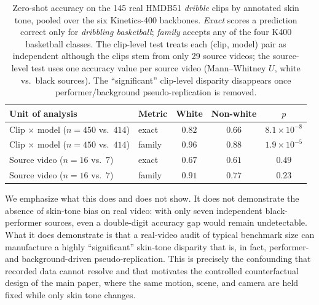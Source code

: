 \begin{table}[t]
\centering
\caption{Zero-shot accuracy on the 145 real HMDB51 \textit{dribble} clips by
annotated skin tone, pooled over the six Kinetics-400 backbones. \emph{Exact}
scores a prediction correct only for \textit{dribbling basketball};
\emph{family} accepts any of the four K400 basketball classes. The clip-level
test treats each (clip, model) pair as independent although the clips stem
from only 29 source videos; the source-level test uses one accuracy value per
source video (Mann--Whitney $U$, white vs.\ black sources). The
``significant'' clip-level disparity disappears once performer/background
pseudo-replication is removed.}
\label{tab:pahmdb51_dribble}
\begin{tabular}{llccc}
\toprule
Unit of analysis & Metric & White & Non-white & $p$ \\
\midrule
Clip $\times$ model ($n{=}450$ vs.\ $414$) & exact  & $0.82$ & $0.66$ & $8.1\times10^{-8}$ \\
Clip $\times$ model ($n{=}450$ vs.\ $414$) & family & $0.96$ & $0.88$ & $1.9\times10^{-5}$ \\
Source video ($n{=}16$ vs.\ $7$)           & exact  & $0.67$ & $0.61$ & $0.49$ \\
Source video ($n{=}16$ vs.\ $7$)           & family & $0.91$ & $0.77$ & $0.23$ \\
\bottomrule
\end{tabular}
\end{table}

We emphasize what this does and does not show. It does not demonstrate the
absence of skin-tone bias on real video: with only seven independent
black-performer sources, even a double-digit accuracy gap would remain
undetectable. What it does demonstrate is that a real-video audit of typical
benchmark size can manufacture a highly ``significant'' skin-tone disparity
that is, in fact, performer- and background-driven pseudo-replication. This is
precisely the confounding that recorded data cannot resolve and that motivates
the controlled counterfactual design of the main paper, where the same motion,
scene, and camera are held fixed while only skin tone changes.
